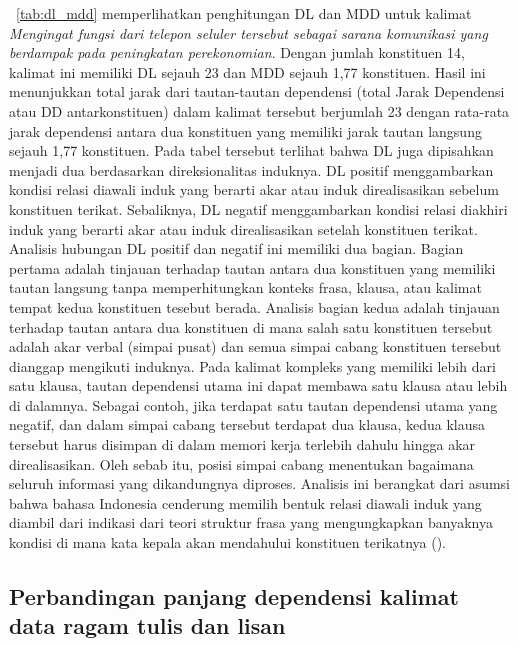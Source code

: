 \tab~\ref{tab:dl_mdd} memperlihatkan penghitungan DL dan MDD untuk kalimat \textit{Mengingat fungsi dari telepon seluler tersebut sebagai sarana komunikasi yang berdampak pada peningkatan perekonomian}. Dengan jumlah konstituen 14, kalimat ini memiliki DL sejauh 23 dan MDD sejauh 1,77 konstituen. Hasil ini menunjukkan total jarak dari tautan-tautan dependensi (total Jarak Dependensi atau DD antarkonstituen) dalam kalimat tersebut berjumlah 23 dengan rata-rata jarak dependensi antara dua konstituen yang memiliki jarak tautan langsung sejauh 1,77 konstituen. Pada tabel tersebut terlihat bahwa DL juga dipisahkan menjadi dua berdasarkan direksionalitas induknya. DL positif menggambarkan kondisi relasi diawali induk yang berarti  akar atau induk direalisasikan sebelum konstituen terikat. Sebaliknya, DL negatif menggambarkan kondisi relasi diakhiri induk yang berarti akar atau induk direalisasikan setelah konstituen terikat. Analisis hubungan DL positif dan negatif ini memiliki dua bagian. Bagian pertama adalah tinjauan terhadap tautan antara dua konstituen yang memiliki tautan langsung tanpa memperhitungkan konteks frasa, klausa, atau kalimat tempat kedua konstituen tesebut berada. Analisis bagian kedua adalah tinjauan terhadap tautan antara dua konstituen di mana salah satu konstituen tersebut adalah akar verbal (simpai pusat) dan semua simpai cabang konstituen tersebut dianggap mengikuti induknya. Pada kalimat kompleks yang memiliki lebih dari satu klausa, tautan dependensi utama ini dapat membawa satu klausa atau lebih di dalamnya. Sebagai contoh, jika terdapat satu tautan dependensi utama yang negatif, dan dalam simpai cabang tersebut terdapat dua klausa, kedua klausa tersebut harus disimpan di dalam memori kerja terlebih dahulu hingga akar direalisasikan. Oleh sebab itu, posisi simpai cabang menentukan bagaimana seluruh informasi yang dikandungnya diproses. Analisis ini berangkat dari asumsi bahwa bahasa Indonesia cenderung memilih bentuk relasi diawali induk yang diambil dari indikasi dari teori struktur frasa yang mengungkapkan banyaknya kondisi di mana kata kepala akan mendahului konstituen terikatnya (\citealp{kridalaksana2002struktur, sneddon2010indonesian}).

\subsection{Perbandingan panjang dependensi kalimat data ragam tulis dan lisan}

